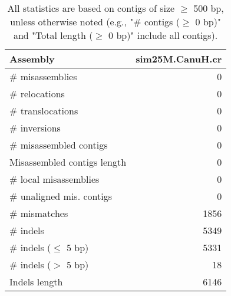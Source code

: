 \documentclass[12pt,a4paper]{article}
\begin{document}
\begin{table}[ht]
\begin{center}
\caption{All statistics are based on contigs of size $\geq$ 500 bp, unless otherwise noted (e.g., "\# contigs ($\geq$ 0 bp)" and "Total length ($\geq$ 0 bp)" include all contigs).}
\begin{tabular}{|l*{1}{|r}|}
\hline
Assembly & sim25M.CanuH.cr \\ \hline
\# misassemblies & 0 \\ \hline
\hspace{5mm}\# relocations & 0 \\ \hline
\hspace{5mm}\# translocations & 0 \\ \hline
\hspace{5mm}\# inversions & 0 \\ \hline
\# misassembled contigs & 0 \\ \hline
Misassembled contigs length & 0 \\ \hline
\# local misassemblies & 0 \\ \hline
\# unaligned mis. contigs & 0 \\ \hline
\# mismatches & 1856 \\ \hline
\# indels & 5349 \\ \hline
\hspace{5mm}\# indels ($\leq$ 5 bp) & 5331 \\ \hline
\hspace{5mm}\# indels ($>$ 5 bp) & 18 \\ \hline
Indels length & 6146 \\ \hline
\end{tabular}
\end{center}
\end{table}
\end{document}
